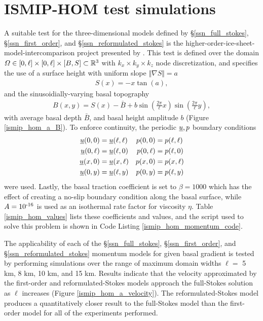 \section{ISMIP-HOM test simulations} \label{ssn_ismip_hom_test_simulations}

A suitable test for the three-dimensional models defined by \S \ref{ssn_full_stokes}, \S \ref{ssn_first_order}, and \S \ref{ssn_reformulated_stokes} is the higher-order-ice-sheet-model-intercomparison project presented by \citet{pattyn_2008}.  This test is defined over the domain $\varOmega \in [0,\ell] \times [0,\ell] \times [B,S] \subset \mathbb{R}^3$ with $k_x \times k_y \times k_z$ node discretization, and specifies the use of a surface height with uniform slope $\Vert \nabla S \Vert = a$
\begin{align*}
  S(x) = - x \tan\left( a \right),
\end{align*}
and the sinusoidially-varying basal topography
\begin{align*}
  B(x,y) = S(x) - \bar{B} + b \sin\left( \frac{2 \pi}{\ell} x \right) \sin\left( \frac{2 \pi}{\ell} y \right),
\end{align*}
with average basal depth $\bar{B}$, and basal height amplitude $b$ (Figure \ref{ismip_hom_a_B}).  To enforce continuity, the periodic $\underline{u},p$ boundary conditions
\begin{align*}
  \underline{u}(0,0)    &= \underline{u}(\ell,\ell) & p(0,0)    &= p(\ell,\ell)\\
  \underline{u}(0,\ell) &= \underline{u}(\ell,0)    & p(0,\ell) &= p(\ell,0)   \\
  \underline{u}(x,0)    &= \underline{u}(x,\ell)    & p(x,0)    &= p(x,\ell)   \\
  \underline{u}(0,y)    &= \underline{u}(\ell,y)    & p(0,y)    &= p(\ell,y)
\end{align*}
were used.  Lastly, the basal traction coefficient is set to $\beta = 1000$ which has the effect of creating a no-slip boundary condition along the basal surface, while $A = 10^{\textrm{-16}}$ is used as an isothermal rate factor for viscosity $\eta$.  Table \ref{ismip_hom_values} lists these coefficients and values, and the \CSLVR script used to solve this problem is shown in Code Listing \ref{ismip_hom_momentum_code}.

The applicability of each of the \S \ref{ssn_full_stokes}, \S \ref{ssn_first_order}, and \S \ref{ssn_reformulated_stokes} momentum models for given basal gradient is tested by performing simulations over the range of maximum domain widths $\ell = $ 5 km, 8 km, 10 km, and 15 km.  Results indicate that the velocity approximated by the first-order and reformulated-Stokes models approach the full-Stokes solution as $\ell$ increases (Figure \ref{ismip_hom_a_velocity}).  The reformulated-Stokes model produces a quantitatively closer result to the full-Stokes model than the first-order model for all of the experiments performed.

